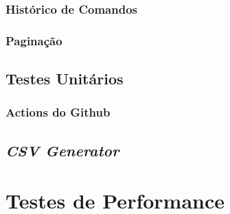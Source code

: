 \documentclass{article}
\begin{document}
        \subsubsection{Histórico de Comandos}
        \subsubsection{Paginação}
    \subsection{Testes Unitários}
        \subsubsection{Actions do Github}
    \subsection{\emph{CSV Generator}}
    \section{Testes de Performance}

        


    
\end{document}
